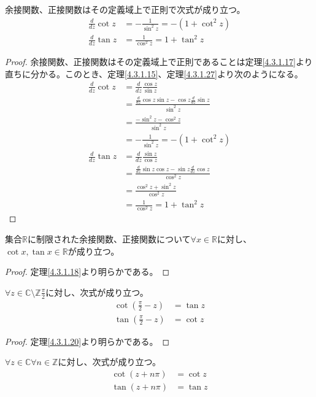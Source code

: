 \documentclass[dvipdfmx]{jsarticle}
\begin{document}
\begin{thm}\label{4.3.1.29} 余接関数、正接関数はその定義域上で正則で次式が成り立つ。
\begin{align*}
\frac{d}{dz}\cot z &= - \frac{1}{\sin^{2}z} = - \left( 1 + \cot^{2}z \right)\\
\frac{d}{dz}\tan z &= \frac{1}{\cos^{2}z} = 1 + \tan^{2}z
\end{align*}
\end{thm}
\begin{proof} 余接関数、正接関数はその定義域上で正則であることは定理\ref{4.3.1.17}より直ちに分かる。このとき、定理\ref{4.3.1.15}、定理\ref{4.3.1.27}より次のようになる。
\begin{align*}
\frac{d}{dz}\cot z &= \frac{d}{dz}\frac{\cos z}{\sin z}\\
&= \frac{\frac{d}{dz}\cos z\sin z - \cos z\frac{d}{dz}\sin z}{\sin^{2}z}\\
&= \frac{- \sin^{2}z - \cos^{2}z}{\sin^{2}z}\\
&= - \frac{1}{\sin^{2}z} = - \left( 1 + \cot^{2}z \right)\\
\frac{d}{dz}\tan z &= \frac{d}{dz}\frac{\sin z}{\cos z}\\
&= \frac{\frac{d}{dz}\sin z\cos z - \sin z\frac{d}{dz}\cos z}{\cos^{2}z}\\
&= \frac{\cos^{2}z + \sin^{2}z}{\cos^{2}z}\\
&= \frac{1}{\cos^{2}z} = 1 + \tan^{2}z
\end{align*}
\end{proof}
\begin{thm}\label{4.3.1.30}
集合$\mathbb{R}$に制限された余接関数、正接関数について$\forall x \in \mathbb{R}$に対し、$\cot x,\tan x \in \mathbb{R}$が成り立つ。
\end{thm}
\begin{proof} 定理\ref{4.3.1.18}より明らかである。
\end{proof}
\begin{thm}\label{4.3.1.31}
$\forall z \in \mathbb{C} \setminus \mathbb{Z}\frac{\pi}{2}$に対し、次式が成り立つ。
\begin{align*}
\cot\left( \frac{\pi}{2} - z \right) &= \tan z\\
\tan\left( \frac{\pi}{2} - z \right) &= \cot z
\end{align*}
\end{thm}
\begin{proof} 定理\ref{4.3.1.20}より明らかである。
\end{proof}
\begin{thm}\label{4.3.1.32}
$\forall z \in \mathbb{C}\forall n \in \mathbb{Z}$に対し、次式が成り立つ。
\begin{align*}
\cot(z + n\pi) &= \cot z\\
\tan(z + n\pi) &= \tan z
\end{align*}
\end{thm}
\end{document}
